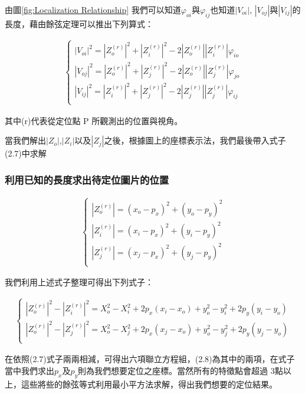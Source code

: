 	由圖\ref{fig:Localization Relationship} 我們可以知道$\varphi _{oi}$與$\varphi _{ij}$也知道$|V_{oi}|$, $|V_{oj}|$與$|V_{ij}|$的長度，藉由餘弦定理可以推出下列算式：
	
	\begin{align}
		\left\{
		\begin{array}{cccc}
		|V_{oi}|^2 = |Z_o^{(r)}|^2 + |Z_i^{(r)}|^2 - 2|Z_o^{(r)}||Z_i^{(r)}|\varphi _{io}\\
		|V_{oj}|^2 = |Z_o^{(r)}|^2 + |Z_j^{(r)}|^2 - 2|Z_o^{(r)}||Z_j^{(r)}|\varphi _{jo}\\
		|V_{ij}|^2 = |Z_i^{(r)}|^2 + |Z_j^{(r)}|^2 - 2|Z_j^{(r)}||Z_j^{(r)}|\varphi _{ij}\\
		\end{array}
		\right.
	\end{align}	
	
	其中(r)代表從定位點 P 所觀測出的位置與視角。	
	
	當我們解出$|Z_o|$,$|Z_i|$以及$|Z_j|$之後，根據圖上的座標表示法，我們最後帶入式子(2.7)中求解
	
	\subsubsection{利用已知的長度求出待定位圖片的位置}
	
	\begin{align}
		\left\{
		\begin{array}{cccc}
		|Z_o^{(r)}| = (x_o - p_x)^2 + (y_o - p_y)^2\\
		|Z_i^{(r)}| = (x_i - p_x)^2 + (y_i - p_y)^2\\
		|Z_j^{(r)}| = (x_j - p_x)^2 + (y_j - p_y)^2\\
		\end{array}
		\right.
	\end{align}	
	
	我們利用上述式子整理可得出下列式子：
	
	\begin{align}
		\left\{
		\begin{array}{cccc}
		|Z_o^{(r)}|^2 - |Z_i^{(r)}|^2 = X_o^2 - X_i^2 + 2p_x(x_i - x_o) + y_o^2 - y_i^2 + 2p_y(y_i-y_o)\\
		|Z_o^{(r)}|^2 - |Z_j^{(r)}|^2 = X_o^2 - X_j^2 + 2p_x(x_j - x_o) + y_o^2 - y_j^2 + 2p_y(y_j-y_o)\\
		\end{array}
		\right.
	\end{align}	
	
	在依照(2.7)式子兩兩相減，可得出六項聯立方程組，(2.8)為其中的兩項，在式子當中我們求出$p_x$及$p_y$則為我們想要定位之座標。當然所有的特徵點會超過
	3點以上，這些將些的餘弦等式利用最小平方法求解，得出我們想要的定位結果。
	
